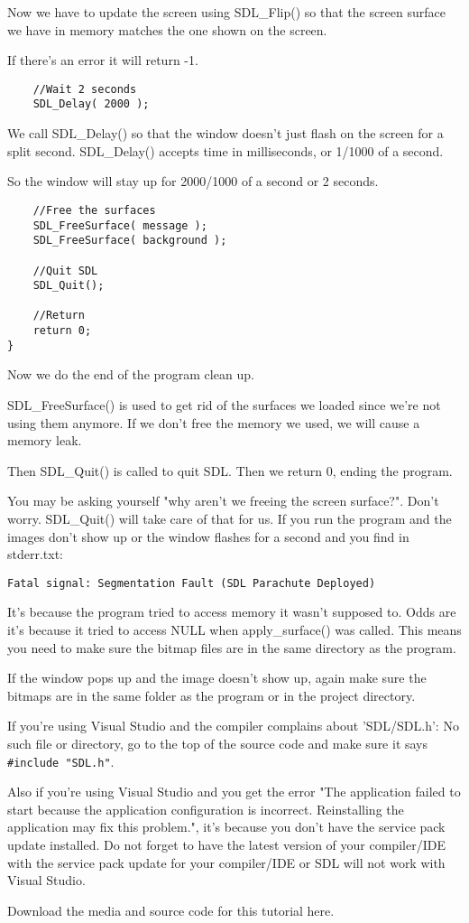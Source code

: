Now we have to update the screen using SDL\_Flip() so that the screen surface we
have in memory matches the one shown on the screen.

If there's an error it will return -1.

\begin{verbatim}
    //Wait 2 seconds
    SDL_Delay( 2000 );
\end{verbatim}

We call SDL\_Delay() so that the window doesn't just flash on the screen for a
split second. SDL\_Delay() accepts time in milliseconds, or 1/1000 of a second.

So the window will stay up for 2000/1000 of a second or 2 seconds.

\begin{verbatim}
    //Free the surfaces
    SDL_FreeSurface( message );
    SDL_FreeSurface( background );

    //Quit SDL
    SDL_Quit();

    //Return
    return 0;
}
\end{verbatim}

Now we do the end of the program clean up.

SDL\_FreeSurface() is used to get rid of the surfaces we loaded since we're not
using them anymore. If we don't free the memory we used, we will cause a memory
leak.

Then SDL\_Quit() is called to quit SDL. Then we return 0, ending the program.

You may be asking yourself "why aren't we freeing the screen surface?". Don't
worry. SDL\_Quit() will take care of that for us. If you run the program and the
images don't show up or the window flashes for a second and you find in
stderr.txt:

\begin{verbatim}
Fatal signal: Segmentation Fault (SDL Parachute Deployed)
\end{verbatim}

It's because the program tried to access memory it wasn't supposed to. Odds are
it's because it tried to access NULL when apply\_surface() was called. This
means you need to make sure the bitmap files are in the same directory as the
program.

If the window pops up and the image doesn't show up, again make sure the bitmaps
are in the same folder as the program or in the project directory.

If you're using Visual Studio and the compiler complains about 'SDL/SDL.h': No
such file or directory, go to the top of the source code and make sure it says
\verb|#include "SDL.h"|.

Also if you're using Visual Studio and you get the error "The application failed
to start because the application configuration is incorrect. Reinstalling the
application may fix this problem.", it's because you don't have the service pack
update installed. Do not forget to have the latest version of your compiler/IDE
with the service pack update for your compiler/IDE or SDL will not work with
Visual Studio.

\bigskip
Download the media and source code for this tutorial here.
